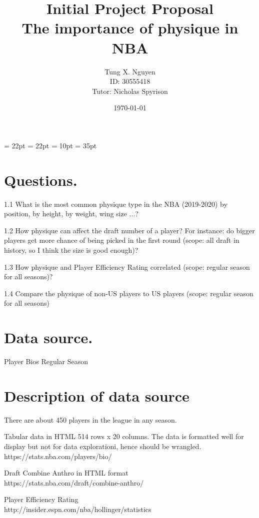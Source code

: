 \documentclass[a4paper,12pt,twoside]{article}
\title{Initial Project Proposal\\The importance of physique in NBA}
\author{Tung X. Nguyen\\ID: 30555418\\Tutor: Nicholas Spyrison}
\date{\today}
\begin{document}
\maketitle
\thispagestyle{empty}
\thispagestyle{empty}

\oddsidemargin = 22pt
\evensidemargin = 22pt
\marginparsep = 10pt
\marginparwidth = 35pt


\section{Questions.}

1.1 What is the most common physique type in the NBA (2019-2020) by position, by height, by weight, wing size ...? 

1.2 How physique can affect the draft number of a player? For instance: do bigger players get more chance of being picked in the first round (scope: all draft in history, so I think the size is good enough)?

1.3 How physique and Player Efficiency Rating correlated (scope: regular season for all seasons)?

1.4 Compare the physique of non-US players to US players (scope: regular season for all seasons)
 


\section{Data source.}
Player Bios Regular Season

\section{Description of data source}
There are about 450 players in the league in any season.

Tabular data in HTML 514 rows x 20 columns. The data is formatted well for display but not for data explorationi, hence should be wrangled.\\
https://stats.nba.com/players/bio/

Draft Combine Anthro in HTML format
\\https://stats.nba.com/draft/combine-anthro/

Player Efficiency Rating\\http://insider.espn.com/nba/hollinger/statistics
 


\end{document}

